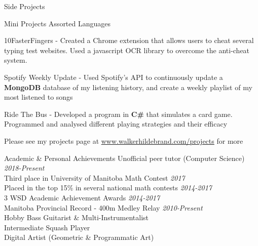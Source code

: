 \documentclass{resume} %
\newcommand{\award}[2]{#1 \hfill {\em #2}}
\begin{document}
\begin{rSection}{Side Projects}
    \vspace{1em}

    \begin{sideproject}
        {Mini Projects}
        {Assorted Languages}
        {}
        {
            \item 10FasterFingers - Created a Chrome extension that allows users to cheat several typing test websites. Used a javascript OCR library to overcome the anti-cheat system.
            \item Spotify Weekly Update - Used Spotify's API to continuously update a \textbf{MongoDB} database of my listening history, and create a weekly playlist of my most listened to songs
            \item Ride The Bus - Developed a program in \textbf{C\#} that simulates a card game. Programmed and analysed different playing strategies and their efficacy
        }
    \end{sideproject}

    \vspace{1em}

    Please see my projects page at \href{http://www.walkerhildebrand.com/projects}{www.walkerhildebrand.com/projects} for more

\end{rSection}


\begin{rSection}{Academic \& Personal Achievements}
    \award{Unofficial peer tutor (Computer Science)}{2018-Present}\\
    \award{Third place in University of Manitoba Math Contest}{2017} \\
    \award{Placed in the top 15\% in several national math contests}{2014-2017} \\
    \award{3 WSD Academic Achievement Awards}{2014-2017}\\
    \award{Manitoba Provincial Record - 400m Medley Relay}{2010-Present}\\
    \award{Hobby Bass Guitarist \& Multi-Instrumentalist}{ }\\
    \award{Intermediate Squash Player}{}\\
    \award{Digital Artist (Geometric \& Programmatic Art)}{}\\
\end{rSection}


    
    
\end{document}
